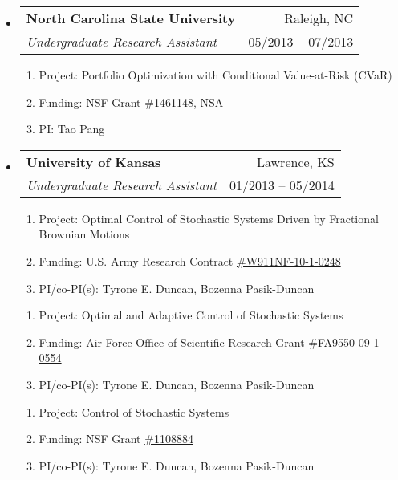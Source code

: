 \documentclass[letterpaper,10pt]{article}
\makeatletter
\newcommand{\subheadingtwolines}[4]{
\begin{tabular*}{6.45in}{l@{\cftdotfill{\cftsecdotsep}\extracolsep{\fill}}r}
#1 & #2 \\
#3 & #4 \\
\end{tabular*}}
\makeatother
\begin{document}
\begin{itemize}[leftmargin=0.4cm, itemsep=0.5cm]
\item[] \hspace{-2ex}\subheadingtwolines{\bf North Carolina State University}{Raleigh, NC}{\it Undergraduate Research Assistant}{05/2013 -- 07/2013}

\begin{enumerate}[leftmargin=0.5cm, itemsep=-0.05ex]
	\item[] Project: Portfolio Optimization with Conditional Value-at-Risk (CVaR)
	\item[] Funding: NSF Grant \href{https://www.nsf.gov/awardsearch/showAward?AWD_ID=1461148&HistoricalAwards=false}{\#1461148}, NSA
	\item[] PI: Tao Pang
\end{enumerate}


\item[] \hspace{-2ex}\subheadingtwolines{\bf University of Kansas}{Lawrence, KS}{\it Undergraduate Research Assistant}{01/2013 -- 05/2014}

\begin{enumerate}[leftmargin=0.5cm, itemsep=-0.05ex]
	\item[] Project: Optimal Control of Stochastic Systems Driven by Fractional Brownian Motions
	\item[] Funding: U.S. Army Research Contract \href{https://apps.dtic.mil/sti/pdfs/ADA614716.pdf}{\#W911NF-10-1-0248}
	\item[] PI/co-PI(s): Tyrone E. Duncan, Bozenna Pasik-Duncan
\end{enumerate}


\begin{enumerate}[leftmargin=0.5cm, itemsep=-0.05ex]
	\item[] Project: Optimal and Adaptive Control of Stochastic Systems
	\item[] Funding: Air Force Office of Scientific Research Grant \href{https://apps.dtic.mil/sti/pdfs/ADA567576.pdf}{\#FA9550-09-1-0554}
	\item[] PI/co-PI(s): Tyrone E. Duncan, Bozenna Pasik-Duncan
\end{enumerate}


\begin{enumerate}[leftmargin=0.5cm, itemsep=-0.05ex]
	\item[] Project: Control of Stochastic Systems
	\item[] Funding: NSF Grant \href{https://www.nsf.gov/awardsearch/showAward?AWD_ID=1108884&HistoricalAwards=false}{\#1108884}
	\item[] PI/co-PI(s): Tyrone E. Duncan, Bozenna Pasik-Duncan
\end{enumerate}

\end{itemize}
\end{document}
